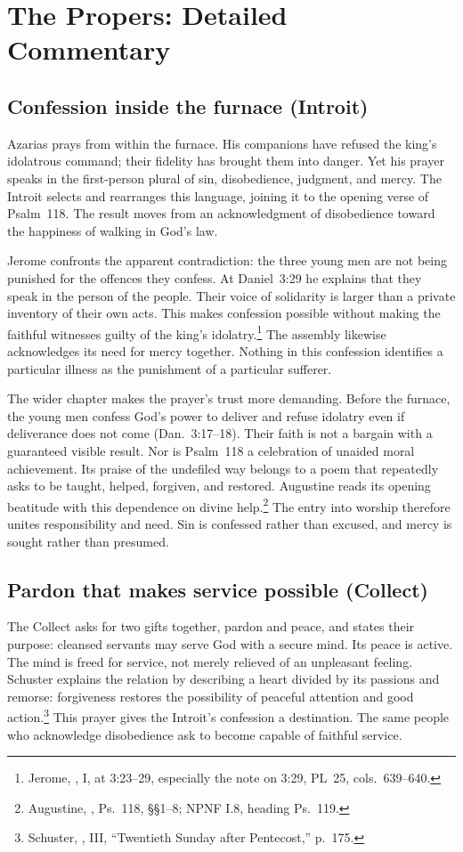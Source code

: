 \section{The Propers: Detailed Commentary}

\subsection{Confession inside the furnace (Introit)}
Azarias prays from within the furnace. His companions have refused the king's
idolatrous command; their fidelity has brought them into danger. Yet his
prayer speaks in the first-person plural of sin, disobedience, judgment,
and mercy. The Introit selects and rearranges this language, joining it to
the opening verse of Psalm~118. The result moves from an acknowledgment
of disobedience toward the happiness of walking in God's law.

Jerome confronts the apparent contradiction: the three young men are not
being punished for the offences they confess. At Daniel~3:29 he explains
that they speak in the person of the people. Their voice of solidarity is
larger than a private inventory of their own acts. This makes confession
possible without making the faithful witnesses guilty of the king's
idolatry.\footnote{Jerome, , I, at 3:23--29,
especially the note on 3:29, PL~25, cols.~639--640.}
The assembly likewise acknowledges its need for mercy together. Nothing
in this confession identifies a particular illness as the punishment of a
particular sufferer.

The wider chapter makes the prayer's trust more demanding. Before the
furnace, the young men confess God's power to deliver and refuse idolatry
even if deliverance does not come (Dan.~3:17--18). Their faith is not a
bargain with a guaranteed visible result. Nor is Psalm~118 a celebration
of unaided moral achievement. Its praise of the undefiled way belongs to
a poem that repeatedly asks to be taught, helped, forgiven, and restored.
Augustine reads its opening beatitude with this dependence on divine
help.\footnote{Augustine, , Ps.~118,
\S\S1--8; NPNF I.8, heading Ps.~119.}
The entry into worship therefore unites responsibility and need. Sin is
confessed rather than excused, and mercy is sought rather than presumed.

\subsection{Pardon that makes service possible (Collect)}
The Collect asks for two gifts together, pardon and peace, and states their
purpose: cleansed servants may serve God with a secure mind. Its peace is
active. The mind is freed for service, not merely relieved of an unpleasant
feeling. Schuster explains the relation by describing a heart divided by
its passions and remorse: forgiveness restores the possibility of peaceful
attention and good action.\footnote{Schuster, , III,
``Twentieth Sunday after Pentecost,'' p.~175.}
This prayer gives the Introit's confession a destination. The same people
who acknowledge disobedience ask to become capable of faithful service.

